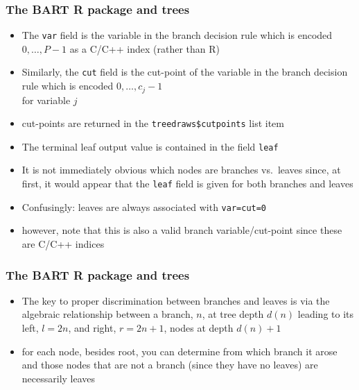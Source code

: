 \documentclass[11pt,dvipsnames,usenames,times]{beamer}
\begin{document}
\begin{frame}[fragile]
\frametitle{The BART R package and trees}
\begin{itemize}
\item
The {\tt var} field is the variable in the branch decision rule which
is encoded $0, \dots, P-1$ as a {C}/{C++} 
index (rather than {R})
\item  Similarly, the {\tt cut}
field is the cut-point of the variable in the branch decision rule
which is encoded $0, \dots, c_j-1$\\ for variable $j$
\item 
cut-points are returned in the {\tt treedraws\$cutpoints} list item
\item 
The terminal leaf output value is contained in the field {\tt leaf}
\item 
It is not immediately obvious which nodes are branches vs.\ leaves
since, at first, it would appear that the {\tt leaf} field is given
for both branches and leaves
\item Confusingly: leaves are always associated with
{\tt var=cut=0}
\item however, note that this is also a valid
branch variable/cut-point since these are {C}/{C++}
indices
\end{itemize}
\end{frame}

\begin{frame}[fragile]
\frametitle{The BART R package and trees}
\begin{itemize}
\item
The key to proper discrimination between branches and leaves is via the
algebraic relationship between a branch, $n$, at tree depth $d(n)$
leading to its left, $l=2n$, and right, $r=2n+1$, nodes at depth
$d(n)+1$
\item for each node, besides root,
you can determine from which branch it arose and those nodes that are
not a branch (since they have no leaves) are necessarily leaves
\end{itemize}
\end{frame}
\end{document}
